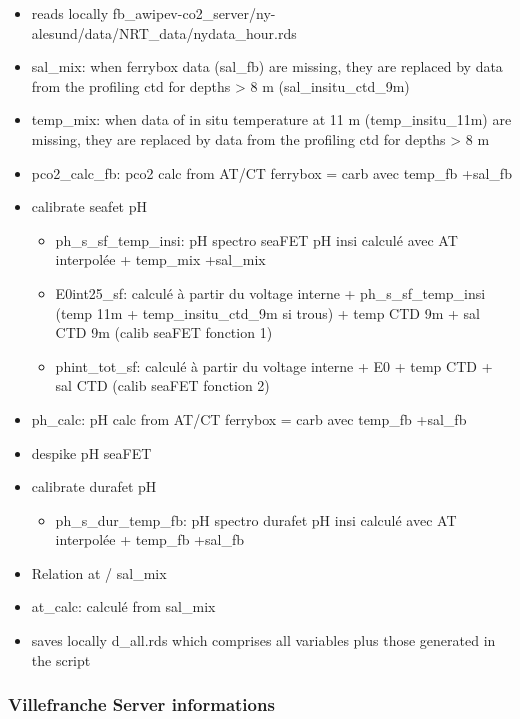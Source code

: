 \documentclass[
]{article}
\providecommand{\tightlist}{%
  \setlength{\itemsep}{0pt}\setlength{\parskip}{0pt}}
\begin{document}
\begin{itemize}
\tightlist
\item
  reads locally
  fb\_awipev-co2\_server/ny-alesund/data/NRT\_data/nydata\_hour.rds
\item
  sal\_mix: when ferrybox data (sal\_fb) are missing, they are replaced
  by data from the profiling ctd for depths \textgreater{} 8 m
  (sal\_insitu\_ctd\_9m)
\item
  temp\_mix: when data of in situ temperature at 11 m
  (temp\_insitu\_11m) are missing, they are replaced by data from the
  profiling ctd for depths \textgreater{} 8 m
\item
  pco2\_calc\_fb: pco2 calc from AT/CT ferrybox = carb avec temp\_fb
  +sal\_fb
\item
  calibrate seafet pH

  \begin{itemize}
  \tightlist
  \item
    ph\_s\_sf\_temp\_insi: pH spectro seaFET pH insi calculé avec AT
    interpolée + temp\_mix +sal\_mix
  \item
    E0int25\_sf: calculé à partir du voltage interne +
    ph\_s\_sf\_temp\_insi (temp 11m + temp\_insitu\_ctd\_9m si trous) +
    temp CTD 9m + sal CTD 9m (calib seaFET fonction 1)
  \item
    phint\_tot\_sf: calculé à partir du voltage interne + E0 + temp CTD
    + sal CTD (calib seaFET fonction 2)
  \end{itemize}
\item
  ph\_calc: pH calc from AT/CT ferrybox = carb avec temp\_fb +sal\_fb
\item
  despike pH seaFET
\item
  calibrate durafet pH

  \begin{itemize}
  \tightlist
  \item
    ph\_s\_dur\_temp\_fb: pH spectro durafet pH insi calculé avec AT
    interpolée + temp\_fb +sal\_fb
  \end{itemize}
\item
  Relation at / sal\_mix
\item
  at\_calc: calculé from sal\_mix
\item
  saves locally d\_all.rds which comprises all variables plus those
  generated in the script
\end{itemize}

\hypertarget{villefranche-server-informations}{%
\subsubsection{Villefranche Server
informations}\label{villefranche-server-informations}}
\end{document}
